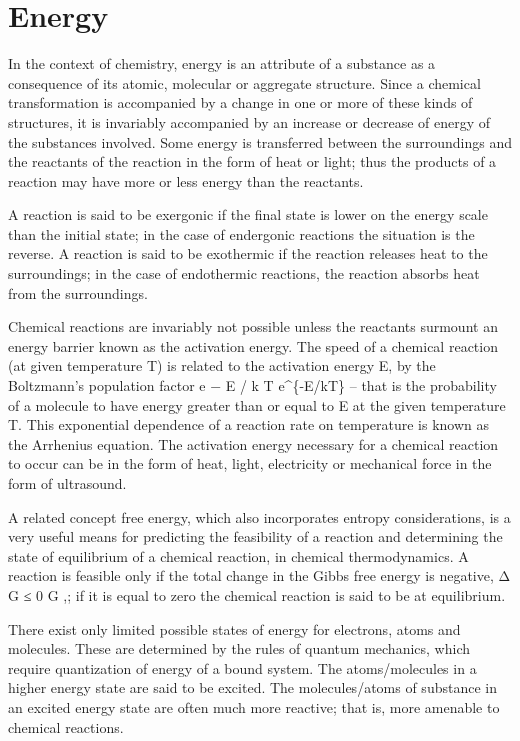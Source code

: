 \documentclass[
]{book}
\begin{document}
\hypertarget{energy}{%
\section{Energy}\label{energy}}

In the context of chemistry, energy is an attribute of a substance as a consequence of its atomic, molecular or aggregate structure. Since a chemical transformation is accompanied by a change in one or more of these kinds of structures, it is invariably accompanied by an increase or decrease of energy of the substances involved. Some energy is transferred between the surroundings and the reactants of the reaction in the form of heat or light; thus the products of a reaction may have more or less energy than the reactants.

A reaction is said to be exergonic if the final state is lower on the energy scale than the initial state; in the case of endergonic reactions the situation is the reverse. A reaction is said to be exothermic if the reaction releases heat to the surroundings; in the case of endothermic reactions, the reaction absorbs heat from the surroundings.

Chemical reactions are invariably not possible unless the reactants surmount an energy barrier known as the activation energy. The speed of a chemical reaction (at given temperature T) is related to the activation energy E, by the Boltzmann's population factor
e
−
E
/
k
T
e\^{}\{-E/kT\} -- that is the probability of a molecule to have energy greater than or equal to E at the given temperature T. This exponential dependence of a reaction rate on temperature is known as the Arrhenius equation. The activation energy necessary for a chemical reaction to occur can be in the form of heat, light, electricity or mechanical force in the form of ultrasound.

A related concept free energy, which also incorporates entropy considerations, is a very useful means for predicting the feasibility of a reaction and determining the state of equilibrium of a chemical reaction, in chemical thermodynamics. A reaction is feasible only if the total change in the Gibbs free energy is negative,
Δ
G
≤
0
\Delta G  ,; if it is equal to zero the chemical reaction is said to be at equilibrium.

There exist only limited possible states of energy for electrons, atoms and molecules. These are determined by the rules of quantum mechanics, which require quantization of energy of a bound system. The atoms/molecules in a higher energy state are said to be excited. The molecules/atoms of substance in an excited energy state are often much more reactive; that is, more amenable to chemical reactions.
\end{document}
